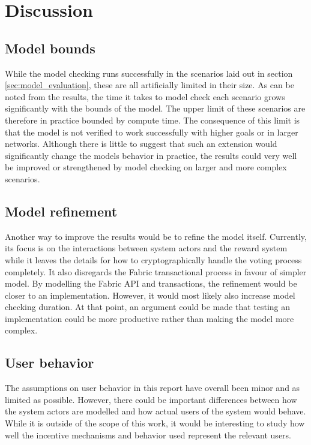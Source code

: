 \chapter{Discussion}
\label{ch:discussion}

\section{Model bounds}

While the model checking runs successfully in the scenarios laid out in section \ref{sec:model_evaluation}, these are all artificially limited in their size. As can be noted from the results, the time it takes to model check each scenario grows significantly with the bounds of the model. The upper limit of these scenarios are therefore in practice bounded by compute time. The consequence of this limit is that the model is not verified to work successfully with higher goals or in larger networks. Although there is little to suggest that such an extension would significantly change the models behavior in practice, the results could very well be improved or strengthened by model checking on larger and more complex scenarios.

\section{Model refinement}

Another way to improve the results would be to refine the model itself. Currently, its focus is on the interactions between system actors and the reward system while it leaves the details for how to cryptographically handle the voting process completely. It also disregards the Fabric transactional process in favour of simpler model. By modelling the Fabric API and transactions, the refinement would be closer to an implementation. However, it would most likely also increase model checking duration. At that point, an argument could be made that testing an implementation could be more productive rather than making the model more complex.


\section{User behavior}

The assumptions on user behavior in this report have overall been minor and as limited as possible. However, there could be important differences between how the system actors are modelled and how actual users of the system would behave. While it is outside of the scope of this work, it would be interesting to study how well the incentive mechanisms and behavior used represent the relevant users.

